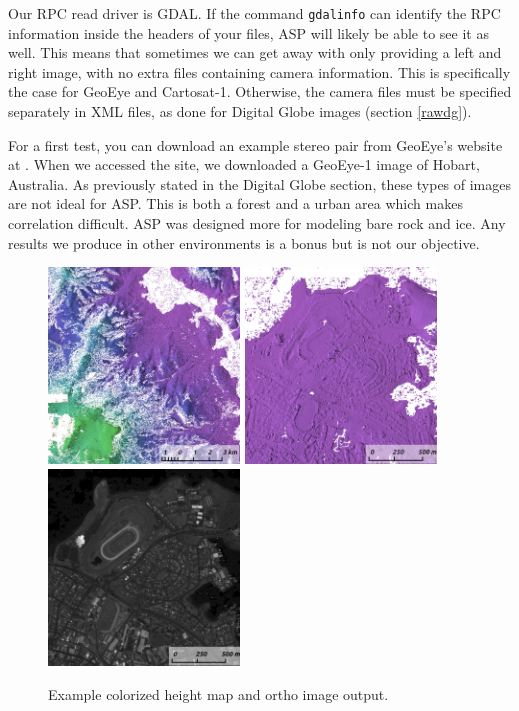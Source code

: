 Our RPC read driver is GDAL. If the command \texttt{gdalinfo} can identify
the RPC information inside the headers of your files, ASP will likely
be able to see it as well. This means that sometimes we can get away
with only providing a left and right image, with no extra files
containing camera information. This is specifically the
case for GeoEye and Cartosat-1. Otherwise, the camera files must be specified 
separately in XML files, as done for Digital
Globe images (section \ref{rawdg}).  

For a first test, you can download an example stereo pair from GeoEye's
website at \cite{geoeye:samples}. When we accessed the site, we
downloaded a GeoEye-1 image of Hobart, Australia. As previously stated
in the Digital Globe section, these types of images are not ideal for
ASP. This is both a forest and a urban area which makes correlation
difficult. ASP was designed more for modeling bare rock and ice. Any
results we produce in other environments is a bonus but is not our
objective.

\begin{figure}[h!]
\centering
  \includegraphics[width=2.0in]{images/examples/geoeye/GeoEye_ContextRender_400px.png}
  \includegraphics[width=2.0in]{images/examples/geoeye/GeoEye_CloseUp_400px.png}
  \includegraphics[width=2.0in]{images/examples/geoeye/GeoEye_CloseUpDRG_400px.png}
\caption{Example colorized height map and ortho image output.}
\label{fig:geoeye-nomap-example}
\end{figure}

